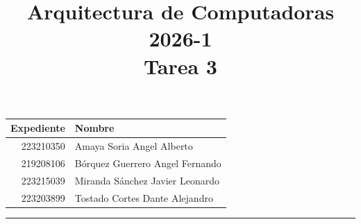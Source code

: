 \documentclass[a4paper, 11pt]{article}
\title
{
    Arquitectura de Computadoras 2026-1 \\
    Tarea 3
}
\begin{document}
\maketitle

\begin{center}
    \begin{tabular}{r|l}
        \textbf{Expediente} & \textbf{Nombre} \\ \hline
        223210350 & Amaya Soria Angel Alberto \\
        219208106 & Bórquez Guerrero Angel Fernando \\
        223215039 & Miranda Sánchez Javier Leonardo \\
        223203899 & Tostado Cortes Dante Alejandro
    \end{tabular}
\end{center}

\rule{\linewidth}{0.3mm}
\end{document}
